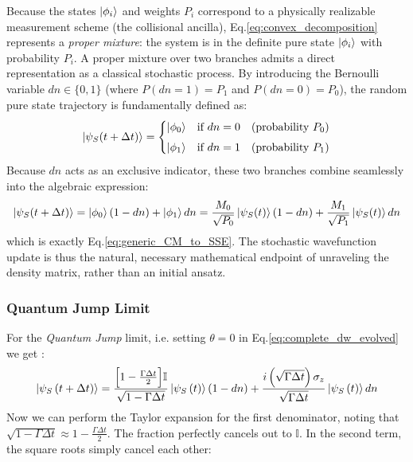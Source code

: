 \documentclass[a4paper,12pt]{article}
\begin{document}
Because the states $\ket{\phi_{i}}$ and weights $P_{i}$ correspond to a physically realizable measurement scheme (the collisional ancilla), Eq.\ref{eq:convex_decomposition} represents a \emph{proper mixture}: the system is in the definite pure state $\ket{\phi_{i}}$ with probability $P_{i}$. A proper mixture over two branches admits a direct representation as a classical stochastic process. By introducing the Bernoulli variable $dn \in \{0,1\}$ (where $P(dn=1) = P_{1}$ and $P(dn=0) = P_{0}$), the random pure state trajectory is fundamentally defined as:
\begin{equation}
	\ket{\psi_{S}(t+\Delta t)} = 
	\begin{cases}
		\ket{\phi_{0}} & \text{if } dn = 0 \quad (\text{probability } P_{0}) \\[4pt]
		\ket{\phi_{1}} & \text{if } dn = 1 \quad (\text{probability } P_{1})
	\end{cases}
	\label{eq:stochastic_branches}
\end{equation}
Because $dn$ acts as an exclusive indicator, these two branches combine seamlessly into the algebraic expression:
\begin{equation}
	\ket{\psi_{S}(t + \Delta t)} 
	= \ket{\phi_{0}} (1 - dn) + \ket{\phi_{1}} dn
	= \frac{M_{0}}{\sqrt{P_{0}}} \ket{\psi_{S}(t)} (1 - dn) + \frac{M_{1}}{\sqrt{P_{1}}} \ket{\psi_{S}(t)} dn
\end{equation}
which is exactly Eq.\ref{eq:generic_CM_to_SSE}. The stochastic wavefunction update is thus the natural, necessary mathematical endpoint of unraveling the density matrix, rather than an initial ansatz.

\subsubsection{Quantum Jump Limit}
For the \textit{Quantum Jump} limit, i.e. setting $ \theta = 0 $ in Eq.\ref{eq:complete_dw_evolved} we get : 
\begin{equation}
	\ket{\psi_{S}\left(t + \Delta t \right)} = 
	\frac{\Big[1 - \frac{\Gamma \Delta t}{2}\Big] \mathbb{I}}
	{\sqrt{1-\Gamma\Delta t}} \ket{\psi_{S}\left(t\right)} \left(1 - dn\right) 
	+ \frac{i \left(\sqrt{\Gamma \Delta t}\right) \sigma_{z}}
	{\sqrt{\Gamma\Delta t}} \ket{\psi_{S}\left(t\right)} dn
\end{equation}
Now we can perform the Taylor expansion for the first denominator, noting that  $\sqrt{1-\Gamma\Delta t} \approx 1 - \frac{\Gamma \Delta t}{2}$. The fraction perfectly 
cancels out to $\mathbb{I}$. In the second term, the square roots simply cancel each other:
\end{document}
